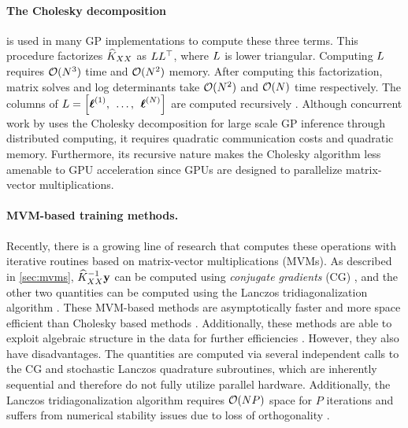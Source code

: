 \paragraph{The Cholesky decomposition} is used in many GP implementations to compute these three terms.
This procedure factorizes $\widehat{K}_{XX}$ as $L L^\top$, where $L$ is lower triangular.
Computing $L$ requires $\bigo{N^3}$ time and $\bigo{N^2}$ memory.
After computing this factorization, matrix solves and log determinants take $\bigo{N^2}$ and $\bigo{N}$ time respectively.
The columns of $L = \left[ \boldsymbol{\ell}^{(1)}, \:\: \ldots, \:\: \boldsymbol{\ell}^{(N)} \right]$ are computed recursively \citep{golub2012matrix}.
Although concurrent work by \citet{nguyen2019exact} uses the Cholesky decomposition for large scale GP inference through distributed computing, it requires quadratic communication costs and quadratic memory.
Furthermore, its recursive nature makes the Cholesky algorithm less amenable to GPU acceleration since GPUs are designed to parallelize matrix-vector multiplications.

\paragraph{MVM-based training methods.}
Recently, there is a growing line of research that computes these operations with iterative routines based on matrix-vector multiplications (MVMs).
As described in \cref{sec:mvms},
$\widehat{K}_{XX}^{-1}\mathbf{y}$ can be computed using \emph{conjugate gradients} (CG) \cite{cunningham2008fast,saatcci2012scalable,cutajar2016preconditioning,ilson2015kernel},
and the other two quantities can be computed using the Lanczos tridiagonalization algorithm \cite{ubaru2017fast,dong2017scalable}.
These MVM-based methods are asymptotically faster and more space efficient than Cholesky based methods \cite{wilson2015kernel,dong2017scalable}.
Additionally, these methods are able to exploit algebraic structure in the data for further efficiencies \cite{cunningham2008fast,saatcci2012scalable,wilson2015kernel}.
However, they also have disadvantages.
The quantities are computed via several independent calls to the CG and stochastic Lanczos quadrature subroutines, which are inherently sequential and therefore do not fully utilize parallel hardware.
Additionally, the Lanczos tridiagonalization algorithm requires $\bigo{NP}$ space for $P$ iterations and suffers from numerical stability issues due to loss of orthogonality \cite{golub2012matrix}.

